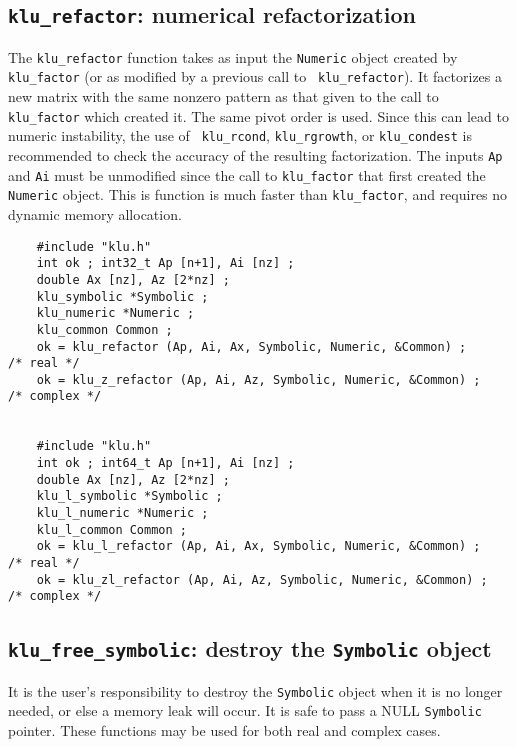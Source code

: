 \documentclass[11pt]{article}
\begin{document}
\subsection{{\tt klu\_refactor}: numerical refactorization}

The {\tt klu\_refactor} function takes as input the {\tt Numeric} object
created by {\tt klu\_factor} (or as modified by a previous call to {\tt
klu\_refactor}).  It factorizes a new matrix with the same nonzero pattern as
that given to the call to {\tt klu\_factor} which created it.  The same pivot
order is used.  Since this can lead to numeric instability, the use of {\tt
klu\_rcond}, {\tt klu\_rgrowth}, or {\tt klu\_condest} is recommended to check
the accuracy of the resulting factorization.  The inputs {\tt Ap} and {\tt Ai}
must be unmodified since the call to {\tt klu\_factor} that first created the
{\tt Numeric} object.  This is function is much faster than {\tt klu\_factor},
and requires no dynamic memory allocation.

{\footnotesize
\begin{verbatim}
    #include "klu.h"
    int ok ; int32_t Ap [n+1], Ai [nz] ;
    double Ax [nz], Az [2*nz] ;
    klu_symbolic *Symbolic ;
    klu_numeric *Numeric ;
    klu_common Common ;
    ok = klu_refactor (Ap, Ai, Ax, Symbolic, Numeric, &Common) ;                      /* real */
    ok = klu_z_refactor (Ap, Ai, Az, Symbolic, Numeric, &Common) ;                    /* complex */


    #include "klu.h"
    int ok ; int64_t Ap [n+1], Ai [nz] ;
    double Ax [nz], Az [2*nz] ;
    klu_l_symbolic *Symbolic ;
    klu_l_numeric *Numeric ;
    klu_l_common Common ;
    ok = klu_l_refactor (Ap, Ai, Ax, Symbolic, Numeric, &Common) ;                    /* real */
    ok = klu_zl_refactor (Ap, Ai, Az, Symbolic, Numeric, &Common) ;                   /* complex */
\end{verbatim}
}

\subsection{{\tt klu\_free\_symbolic}: destroy the {\tt Symbolic} object}

It is the user's responsibility to destroy the {\tt Symbolic} object when it is
no longer needed, or else a memory leak will occur.  It is safe to pass a NULL
{\tt Symbolic} pointer.  These functions may be used for both real and complex
cases.
\end{document}
